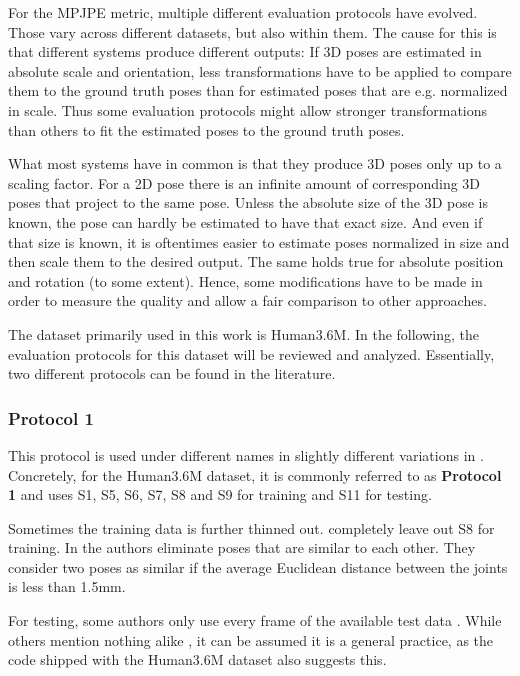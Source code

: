 For the MPJPE metric, multiple different evaluation protocols have evolved.
Those vary across different datasets, but also within them.
The cause for this is that different systems produce different outputs: 
If 3D poses are estimated in absolute scale and orientation, less transformations have to be applied to compare them to the ground truth poses than for estimated poses that are e.g. normalized in scale. 
Thus some evaluation protocols might allow stronger transformations than others to fit the estimated poses to the ground truth poses.

What most systems have in common is that they produce 3D poses only up to a scaling factor.
For a 2D pose there is an infinite amount of corresponding 3D poses that project to the same pose.
Unless the absolute size of the 3D pose is known, the pose can hardly be estimated to have that exact size.
And even if that size is known, it is oftentimes easier to estimate poses normalized in size and then scale them to the desired output.
The same holds true for absolute position and rotation (to some extent).
Hence, some modifications have to be made in order to measure the quality and allow a fair comparison to other approaches.

The dataset primarily used in this work is Human3.6M.
In the following, the evaluation protocols for this dataset will be reviewed and analyzed.
Essentially, two different protocols can be found in the literature.

\subsubsection{Protocol 1}

This protocol is used under different names in slightly different variations in \cite{sun17, drover18, moreno-noguer16, yasin16, kostrikov14, tome17}.
Concretely, for the Human3.6M dataset, it is commonly referred to as \textbf{Protocol 1} and uses S1, S5, S6, S7, S8 and S9 for training and S11 for testing.

Sometimes the training data is further thinned out.
\citet{drover18} completely leave out S8 for training.
In \cite{yasin16} the authors eliminate poses that are similar to each other.
They consider two poses as similar if the average Euclidean distance between the joints is less than 1.5mm.

For testing, some authors only use every  frame of the available test data \cite{sun17, chen17, yasin16, moreno-noguer16, tome17}.
While others mention nothing alike \cite{drover18, kostrikov14}, it can be assumed it is a general practice, as the code shipped with the Human3.6M dataset also suggests this.


